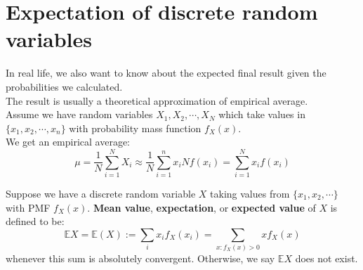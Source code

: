 \documentclass{huhtakm-template-book}
\newcommand{\expect}{\mathbb{E}}
\begin{document}
\section{Expectation of discrete random variables}
    In real life, we also want to know about the expected final result given the probabilities we calculated.\\
    The result is usually a theoretical approximation of empirical average.\\
    Assume we have random variables $X_{1},X_{2},\cdots,X_{N}$ which take values in $\{x_{1},x_{2},\cdots,x_{n}\}$ with probability mass function $f_{X}(x)$.\\
    We get an empirical average:
    \begin{equation*}
        \mu=\frac{1}{N}\sum_{i=1}^{N}X_{i}\approx\frac{1}{N}\sum_{i=1}^{n}x_{i}Nf(x_{i})=\sum_{i=1}^{N}x_{i}f(x_{i})
    \end{equation*}
    \begin{defn}
        Suppose we have a discrete random variable $X$ taking values from $\{x_{1},x_{2},\cdots\}$ with PMF $f_{X}(x)$. \textbf{Mean value}, \textbf{expectation}, or \textbf{expected value} of $X$ is defined to be:
        \begin{equation*}
            \expect X=\expect(X):=\sum_{i}x_{i}f_{X}(x_{i})=\sum_{x:f_{X}(x)>0}xf_{X}(x)
        \end{equation*}
        whenever this sum is absolutely convergent. Otherwise, we say $\expect X$ does not exist.
    \end{defn}
\end{document}
